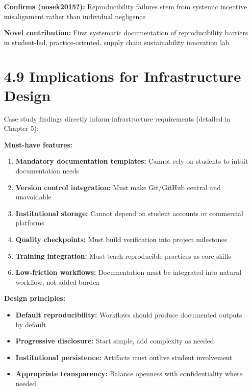 \documentclass[
  oneside,
  open=any]{scrbook}
\providecommand{\tightlist}{%
  \setlength{\itemsep}{0pt}\setlength{\parskip}{0pt}}\usepackage{longtable,booktabs,array}
\begin{document}
\textbf{Confirms (\textbf{nosek2015?}):} Reproducibility failures stem
from systemic incentive misalignment rather than individual negligence

\textbf{Novel contribution:} First systematic documentation of
reproducibility barriers in student-led, practice-oriented, supply chain
sustainability innovation lab

\section{4.9 Implications for Infrastructure
Design}\label{implications-for-infrastructure-design}

Case study findings directly inform infrastructure requirements
(detailed in Chapter 5):

\textbf{Must-have features:}

\begin{enumerate}
\def\labelenumi{\arabic{enumi}.}
\tightlist
\item
  \textbf{Mandatory documentation templates:} Cannot rely on students to
  intuit documentation needs
\item
  \textbf{Version control integration:} Must make Git/GitHub central and
  unavoidable
\item
  \textbf{Institutional storage:} Cannot depend on student accounts or
  commercial platforms
\item
  \textbf{Quality checkpoints:} Must build verification into project
  milestones
\item
  \textbf{Training integration:} Must teach reproducible practices as
  core skills
\item
  \textbf{Low-friction workflows:} Documentation must be integrated into
  natural workflow, not added burden
\end{enumerate}

\textbf{Design principles:}

\begin{itemize}
\tightlist
\item
  \textbf{Default reproducibility:} Workflows should produce documented
  outputs by default
\item
  \textbf{Progressive disclosure:} Start simple, add complexity as
  needed
\item
  \textbf{Institutional persistence:} Artifacts must outlive student
  involvement
\item
  \textbf{Appropriate transparency:} Balance openness with
  confidentiality where needed
\end{itemize}
\end{document}
